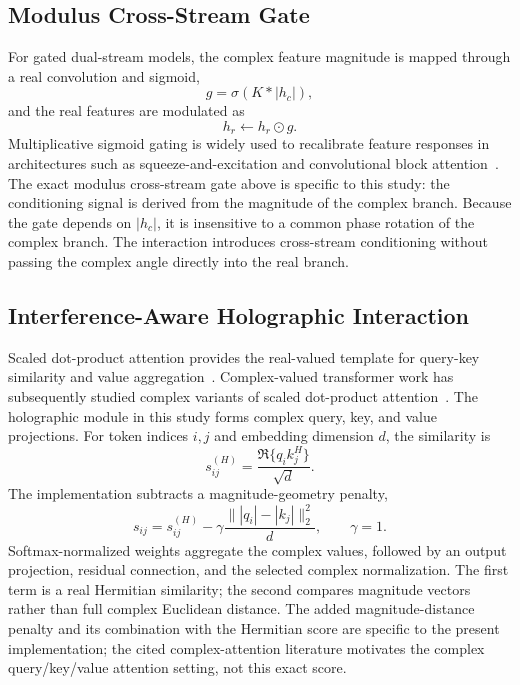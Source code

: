 \subsection{Modulus Cross-Stream Gate}
For gated dual-stream models, the complex feature magnitude is mapped through a real convolution and sigmoid,
\begin{equation}
g=\sigma(K*|h_c|),
\end{equation}
and the real features are modulated as
\begin{equation}
h_r\leftarrow h_r\odot g.
\end{equation}
Multiplicative sigmoid gating is widely used to recalibrate feature responses in architectures such as squeeze-and-excitation and convolutional block attention~\cite{Hu2018SENet,Woo2018CBAM}. The exact modulus cross-stream gate above is specific to this study: the conditioning signal is derived from the magnitude of the complex branch. Because the gate depends on $|h_c|$, it is insensitive to a common phase rotation of the complex branch. The interaction introduces cross-stream conditioning without passing the complex angle directly into the real branch.

\subsection{Interference-Aware Holographic Interaction}
Scaled dot-product attention provides the real-valued template for query-key similarity and value aggregation~\cite{Vaswani2017Attention}. Complex-valued transformer work has subsequently studied complex variants of scaled dot-product attention~\cite{Eilers2023ComplexTransformer}. The holographic module in this study forms complex query, key, and value projections. For token indices $i,j$ and embedding dimension $d$, the similarity is
\begin{equation}
s_{ij}^{(H)}=\frac{\Re\{q_i k_j^H\}}{\sqrt d}.
\end{equation}
The implementation subtracts a magnitude-geometry penalty,
\begin{equation}
s_{ij}=s_{ij}^{(H)}-\gamma\frac{\||q_i|-|k_j|\|_2^2}{d},\qquad \gamma=1.
\label{eq:holographic}
\end{equation}
Softmax-normalized weights aggregate the complex values, followed by an output projection, residual connection, and the selected complex normalization. The first term is a real Hermitian similarity; the second compares magnitude vectors rather than full complex Euclidean distance. The added magnitude-distance penalty and its combination with the Hermitian score are specific to the present implementation; the cited complex-attention literature motivates the complex query/key/value attention setting, not this exact score.


